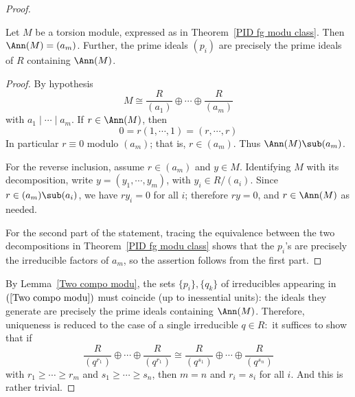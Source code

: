 \begin{proof}
\begin{lemma}\label{Tor anni}
Let $M$ be a torsion module, expressed as in Theorem~\ref{PID fg modu class}. Then $\Ann(M)=(a_m)$. Further, the prime ideals $(p_i)$ are precisely the prime ideals of $R$ containing $\Ann(M)$.
\end{lemma}
\begin{proof}
By hypothesis
\[M\cong\dfrac{R}{(a_1)}\oplus\cdots\oplus\dfrac{R}{(a_m)}\]
with $a_1\mid\cdots\mid a_m$. If $r\in\Ann(M)$, then
\[0=r(1,\cdots,1)=(r,\cdots,r)\]
In particular $r\equiv0$ modulo $(a_m)$; that is, $r\in(a_m)$. Thus $\Ann(M)\sub(a_m)$.\par 
For the reverse inclusion, assume $r\in(a_m)$ and $y\in M$. Identifying $M$ with its decomposition, write $y=(y_1,\cdots,y_m)$, with $y_i\in R/(a_i)$. Since $r\in(a_m)\sub(a_i)$, we have $ry_i=0$ for all $i$; therefore $ry=0$, and $r\in\Ann(M)$ as needed.\par
For the second part of the statement, tracing the equivalence between the two decompositions in Theorem~\ref{PID fg modu class} shows that the $p_i$'s are precisely the irreducible factors of $a_m$, so the assertion follows from the first part.
\end{proof}
By Lemma~\ref{Two compo modu}, the sets $\{p_i\},\{q_k\}$ of irreducibles appearing in $(\ref{Two compo modu})$ must coincide (up to inessential units): the ideals they generate are precisely the prime ideals containing $\Ann(M)$. Therefore, uniqueness is reduced to the case of a single irreducible $q\in R:$ it suffices to show that if
\[\dfrac{R}{(q^{r_1})}\oplus\cdots\oplus\dfrac{R}{(q^{r_1})}\cong\dfrac{R}{(q^{s_1})}\oplus\cdots\oplus\dfrac{R}{(q^{s_n})}\]
with $r_1\geq \cdots\geq r_m$ and $s_1\geq\cdots\geq s_n$, then $m=n$ and $r_i=s_i$ for all $i$. And this is rather trivial.
\end{proof}
